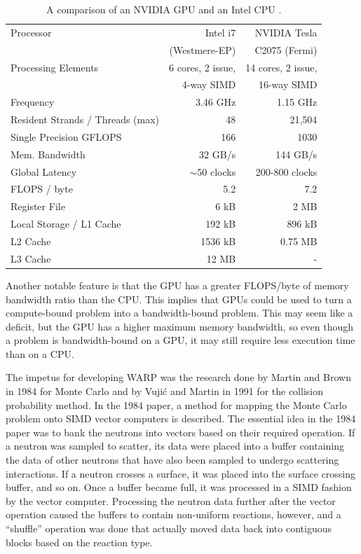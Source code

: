 \documentclass[preprint,12pt]{elsarticle}
\begin{document}
\begin{table}[h]
\centering
\caption[A comparison of an NVIDIA GPU and an Intel CPU]{A comparison of an NVIDIA GPU and an Intel CPU \cite{cent, cpu_latency, opteronperformance}.}
\label{gpu_cpu_comp}
\begin{tabular}{| l | r | r |}
\hline
Processor & Intel i7 & NVIDIA Tesla  \\
 &  (Westmere-EP) & C2075 (Fermi) \\
\hline
\hline
Processing Elements & 6 cores, 2 issue, & 14 cores, 2 issue, \\
& 4-way SIMD &  16-way SIMD  \\
\hline
Frequency & 3.46 GHz &  1.15 GHz \\
\hline
Resident Strands / Threads (max) & 48 & 21,504 \\
\hline
Single Precision GFLOPS & 166 & 1030 \\
\hline
Mem. Bandwidth &  32 GB/s & 144 GB/s \\
\hline
Global Latency & $\sim$50 clocks & 200-800 clocks  \\
\hline
FLOPS / byte & 5.2  & 7.2 \\
\hline
Register File & 6 kB & 2 MB \\
\hline
Local Storage / L1 Cache & 192 kB & 896 kB \\
\hline
L2 Cache & 1536 kB & 0.75 MB \\
\hline
L3 Cache & 12 MB & - \\
\hline
\end{tabular}
\end{table}

Another notable feature is that the GPU has a greater FLOPS/byte of memory bandwidth ratio than the CPU.  This implies that GPUs could be used to turn a compute-bound problem into a bandwidth-bound problem.  This may seem like a deficit, but the GPU has a higher maximum memory bandwidth, so even though a problem is bandwidth-bound on a GPU, it may still require less execution time than on a CPU.

The impetus for developing WARP was the research done by Martin and Brown in 1984 \cite{vector} for Monte Carlo and by Vuji\'{c} and Martin in 1991 \cite{vujic_vector} for the collision probability method.  In the 1984 paper, a method for mapping the Monte Carlo problem onto SIMD vector computers is described.  The essential idea in the 1984 paper was to bank the neutrons into vectors based on their required operation.  If a neutron was sampled to scatter, its data were placed into a buffer containing the data of other neutrons that have also been sampled to undergo scattering interactions.  If a neutron crosses a surface, it was placed into the surface crossing buffer, and so on.  Once a buffer became full, it was processed in a SIMD fashion by the vector computer.  Processing the neutron data further after the vector operation caused the buffers to contain non-uniform reactions, however, and a ``shuffle'' operation was done that actually moved data back into contiguous blocks based on the reaction type.  
\end{document}
